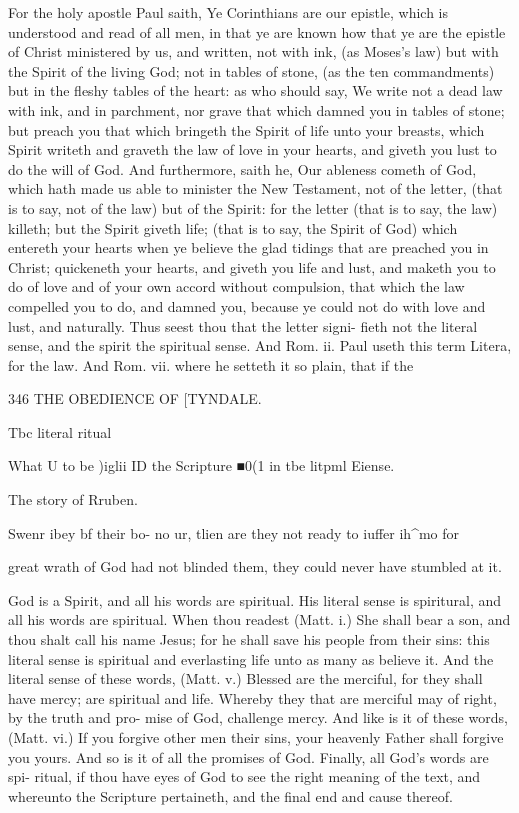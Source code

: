 \documentclass{custom}
\begin{document}
{For the holy apostle Paul saith, Ye Corinthians are 
our epistle, which is understood and read of all men, in 
that ye are known how that ye are the epistle of Christ 
ministered by us, and written, not with ink, (as Moses's law) 
but with the Spirit of the living God; not in tables of 
stone, (as the ten commandments) but in the fleshy tables 
of the heart: as who should say, We write not a dead law 
with ink, and in parchment, nor grave that which damned 
you in tables of stone; but preach you that which bringeth 
the Spirit of life unto your breasts, which Spirit writeth 
and graveth the law of love in your hearts, and giveth you 
lust to do the will of God. And furthermore, saith he, 
Our ableness cometh of God, which hath made us able to 
minister the New Testament, not of the letter, (that is to 
say, not of the law) but of the Spirit: for the letter (that 
is to say, the law) killeth; but the Spirit giveth life; (that 
is to say, the Spirit of God) which entereth your hearts 
when ye believe the glad tidings that are preached you in 
Christ; quickeneth your hearts, and giveth you life and 
lust, and maketh you to do of love and of your own accord 
without compulsion, that which the law compelled you to 
do, and damned you, because ye could not do with love 
and lust, and naturally. Thus seest thou that the letter signi- 
fieth not the literal sense, and the spirit the spiritual sense. 
And Rom. ii. Paul useth this term Litera, for the law. 
And Rom. vii. where he setteth it so plain, that if the 


346
THE OBEDIENCE OF
[TYNDALE.

Tbc literal 
ritual 

What U to 
be ^^iiglii 
ID the 
Scripture 
■0(1 in tbe 
litpml 
Eiense. 

The story 
of Rruben. 

Swenr ibey 
bf their bo- 
no ur, tlien 
are they 
not ready 
to iuffer 
ih^mo for 

great wrath of God had not blinded them, they could 
never have stumbled at it. 

God is a Spirit, and all his words are spiritual. His 
literal sense is spiritural, and all his words are spiritual. 
When thou readest (Matt. i.) She shall bear a son, and 
thou shalt call his name Jesus; for he shall save his 
people from their sins: this literal sense is spiritual and 
everlasting life unto as many as believe it. And the literal 
sense of these words, (Matt. v.) Blessed are the merciful, 
for they shall have mercy; are spiritual and life. Whereby 
they that are merciful may of right, by the truth and pro- 
mise of God, challenge mercy. And like is it of these 
words, (Matt. vi.) If you forgive other men their sins, your 
heavenly Father shall forgive you yours. And so is it of 
all the promises of God. Finally, all God's words are spi- 
ritual, if thou have eyes of God to see the right meaning of 
the text, and whereunto the Scripture pertaineth, and the 
final end and cause thereof. 

}
\end{document}
